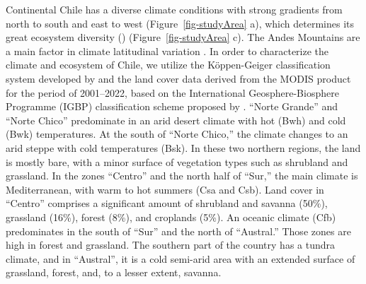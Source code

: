 \documentclass[
  authoryear,
  preprint,
  3p,
  onecolumn]{elsarticle}
\begin{document}
Continental Chile has a diverse climate conditions with strong gradients
from north to south and east to west \citep{Aceituno2021}
(Figure~\ref{fig-studyArea} a), which determines its great ecosystem
diversity (\citet{Luebert2022}) (Figure~\ref{fig-studyArea} c). The
Andes Mountains are a main factor in climate latitudinal variation
\citep{Garreaud2009}. In order to characterize the climate and ecosystem
of Chile, we utilize the Köppen-Geiger classification system developed
by \citet{Beck2023} and the land cover data derived from the MODIS
product for the period of 2001--2022, based on the International
Geosphere-Biosphere Programme (IGBP) classification scheme proposed by
\citet{Friedl2019}. ``Norte Grande'' and ``Norte Chico'' predominate in
an arid desert climate with hot (Bwh) and cold (Bwk) temperatures. At
the south of ``Norte Chico,'' the climate changes to an arid steppe with
cold temperatures (Bsk). In these two northern regions, the land is
mostly bare, with a minor surface of vegetation types such as shrubland
and grassland. In the zones ``Centro'' and the north half of ``Sur,''
the main climate is Mediterranean, with warm to hot summers (Csa and
Csb). Land cover in ``Centro'' comprises a significant amount of
shrubland and savanna (50\%), grassland (16\%), forest (8\%), and
croplands (5\%). An oceanic climate (Cfb) predominates in the south of
``Sur'' and the north of ``Austral.'' Those zones are high in forest and
grassland. The southern part of the country has a tundra climate, and in
``Austral'', it is a cold semi-arid area with an extended surface of
grassland, forest, and, to a lesser extent, savanna.
\end{document}
